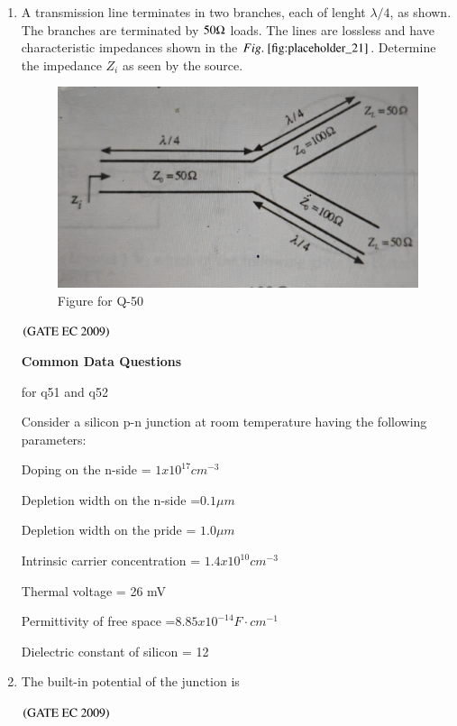 \documentclass[journal,12pt,onecolumn]{IEEEtran}
\theoremstyle{remark}
\begin{document}
\begin{enumerate}[start=1, label={Q\arabic*.}]
\item A transmission line terminates in two branches, each of lenght $\lambda/4$, as shown. The branches are terminated by $50 \ohm$ loads. The lines are lossless and have characteristic impedances shown in the $\figref{fig:placeholder_21}$. Determine the impedance $Z_i$ as seen by the source.
\begin{figure}[H]
    \centering
    \includegraphics[width=0.5\columnwidth]{figs/img_21.jpg}
    \caption{\centering Figure for Q-50}
    \label{fig:placeholder_20}
\end{figure}
\begin{enumerate}
\end{enumerate}
\hfill $\left(\text{GATE EC 2009}\right)$

\textbf{Common Data Questions}

for q51 and q52

Consider a silicon p-n junction at room temperature having the following parameters:

Doping on the n-side = $1 x 10^{17} cm^{-3}$

Depletion width on the n-side =$ 0.1 \mu m $

Depletion width on the pride = $1.0 \mu m $

Intrinsic carrier concentration = $1.4 x 10^{10} cm^{-3} $

Thermal voltage = 26 mV 

Permittivity of free space =$8.85 x 10^{-14 }F \cdot cm^{-1} $

Dielectric constant of silicon = 12
\item The built-in potential of the junction is 
\begin{enumerate}
\end{enumerate}
\hfill $\left(\text{GATE EC 2009}\right)$


\end{enumerate}
\end{document}
